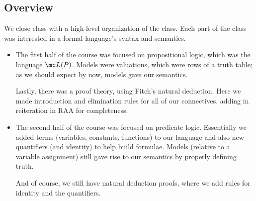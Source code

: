 \documentclass[../notes.tex]{subfiles}
\begin{document}
\subsection{Overview}
We close class with a high-level organization of the class. Each part of the class was interested in a formal language's syntax and semantics.
\begin{itemize}
	\item The first half of the course was focused on propositional logic, which was the language $\mc L(P)$. Models were valuations, which were rows of a truth table; as we should expect by now, models gave our semantics.

	Lastly, there was a proof theory, using Fitch's natural deduction. Here we made introduction and elimination rules for all of our connectives, adding in reiteration in RAA for completeness.

	\item The second half of the course was focused on predicate logic. Essentially we added terms (variables, constants, functions) to our language and also new quantifiers (and identity) to help build formulae. Models (relative to a variable assignment) still gave rise to our semantics by properly defining truth.

	And of course, we still have natural deduction proofs, where we add rules for identity and the quantifiers.
\end{itemize}
\end{document}
